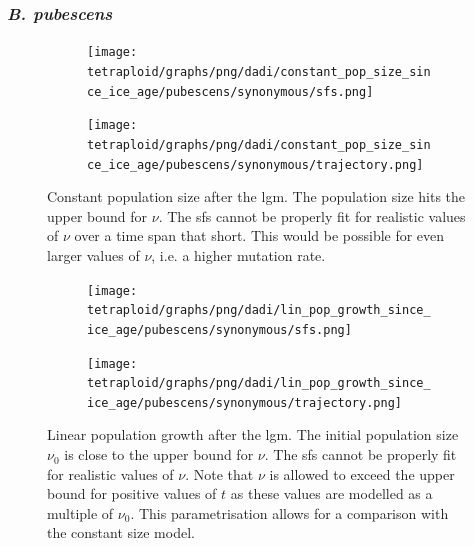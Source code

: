 \documentclass[hidelinks,11pt]{article}
\newcommand{\pubescens}{\textit{B. pubescens}}
\begin{document}
    \subsubsection{\pubescens{}}

    \begin{figure}[H]
        \centering
        \begin{subfigure}[b]{0.465\textwidth}
            \texttt{[image: tetraploid/graphs/png/dadi/constant\_pop\_size\_since\_ice\_age/pubescens/synonymous/sfs.png]}
        \end{subfigure}
        \hfill
        \begin{subfigure}[b]{0.525\textwidth}
            \texttt{[image: tetraploid/graphs/png/dadi/constant\_pop\_size\_since\_ice\_age/pubescens/synonymous/trajectory.png]}
        \end{subfigure}
        \caption{Constant population size after the \acrshort{lgm}. The population size hits the upper bound for $\nu$. The \acrshort{sfs} cannot be properly fit for realistic values of $\nu$ over a time span that short. This would be possible for even larger values of $\nu$, i.e. a higher mutation rate.}
        \label{fig:constant_pop_size_since_ice_age_pubescens}
    \end{figure}

    \begin{figure}[H]
        \centering
        \begin{subfigure}[b]{0.465\textwidth}
            \texttt{[image: tetraploid/graphs/png/dadi/lin\_pop\_growth\_since\_ice\_age/pubescens/synonymous/sfs.png]}
        \end{subfigure}
        \hfill
        \begin{subfigure}[b]{0.525\textwidth}
            \texttt{[image: tetraploid/graphs/png/dadi/lin\_pop\_growth\_since\_ice\_age/pubescens/synonymous/trajectory.png]}
        \end{subfigure}
        \caption{Linear population growth after the \acrshort{lgm}. The initial population size $\nu_0$ is close to the upper bound for $\nu$. The \acrshort{sfs} cannot be properly fit for realistic values of $\nu$. Note that $\nu$ is allowed to exceed the upper bound for positive values of $t$ as these values are modelled as a multiple of $\nu_0$. This parametrisation allows for a comparison with the constant size model.}
        \label{fig:lin_pop_growth_since_ice_age_pubescens}
    \end{figure}
\end{document}
